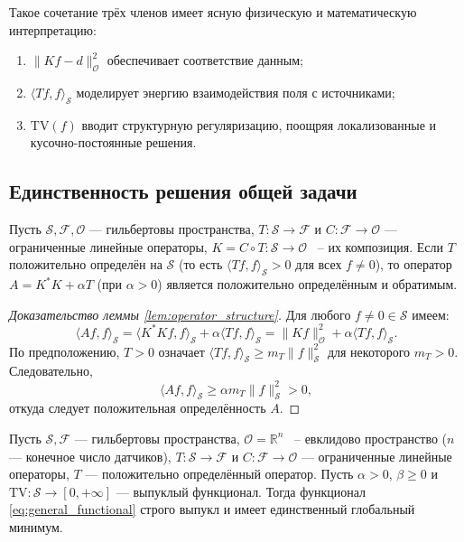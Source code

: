 \documentclass[a4paper,14pt,oneside,openany]{extarticle}
\begin{document}
Такое сочетание трёх членов имеет ясную физическую и математическую интерпретацию:
\begin{enumerate}
    \item $\|K f - d\|_{\mathcal{O}}^2$ обеспечивает соответствие данным;
    \item $\langle T f, f\rangle_{\mathcal{S}}$ моделирует энергию взаимодействия поля с источниками;
    \item $\mathrm{TV}(f)$ вводит структурную регуляризацию, поощряя локализованные и кусочно-постоянные 
    решения.
\end{enumerate}

\subsection{Единственность решения общей задачи}

\begin{lemma}\label{lem:operator_structure}
Пусть $\mathcal{S},\mathcal{F},\mathcal{O}$ — гильбертовы пространства, $T:\mathcal{S}\to\mathcal{F}$
 и $C:\mathcal{F}\to\mathcal{O}$ — ограниченные линейные операторы, $K=C\circ T:\mathcal{S}\to\mathcal{O}$
~-- их композиция. Если $T$ положительно определён на $\mathcal{S}$ 
(то есть $\langle Tf, f\rangle_{\mathcal{S}} > 0$ для всех $f \neq 0$), 
то оператор $A=K^*K+\alpha T$ (при $\alpha>0$) является положительно определённым и обратимым.
\end{lemma}

\begin{proof}[Доказательство леммы \ref{lem:operator_structure}]
Для любого $f \neq 0 \in \mathcal{S}$ имеем:
\begin{equation}
    \langle Af, f\rangle_{\mathcal{S}} = \langle K^*Kf, f\rangle_{\mathcal{S}} + 
    \alpha \langle Tf, f\rangle_{\mathcal{S}} = \|Kf\|_{\mathcal{O}}^2 + \alpha \langle Tf, f\rangle_{\mathcal{S}}.
\end{equation}
По предположению, $T>0$ означает $\langle Tf, f\rangle_{\mathcal{S}} \geq m_T \|f\|_{\mathcal{S}}^2$ для некоторого $m_T > 0$. Следовательно,
\begin{equation}
    \langle Af, f\rangle_{\mathcal{S}} \geq \alpha m_T \|f\|_{\mathcal{S}}^2 > 0,
\end{equation}
откуда следует положительная определённость $A$.
\end{proof}

\begin{theorem}\label{th:general_uniqueness}
Пусть $\mathcal{S},\mathcal{F}$ — гильбертовы пространства, $\mathcal{O} = \mathbb{R}^n$ ~-- 
евклидово пространство ($n$ — конечное число датчиков), $T:\mathcal{S}\to\mathcal{F}$ и 
$C:\mathcal{F}\to\mathcal{O}$ — ограниченные линейные операторы, 
$T$ — положительно определённый оператор. 
Пусть $\alpha>0$, $\beta\ge0$ и $\mathrm{TV}:\mathcal{S}\to[0,+\infty]$ — выпуклый
функционал. Тогда функционал \eqref{eq:general_functional} строго выпукл и имеет единственный 
глобальный минимум.
\end{theorem}
\end{document}
